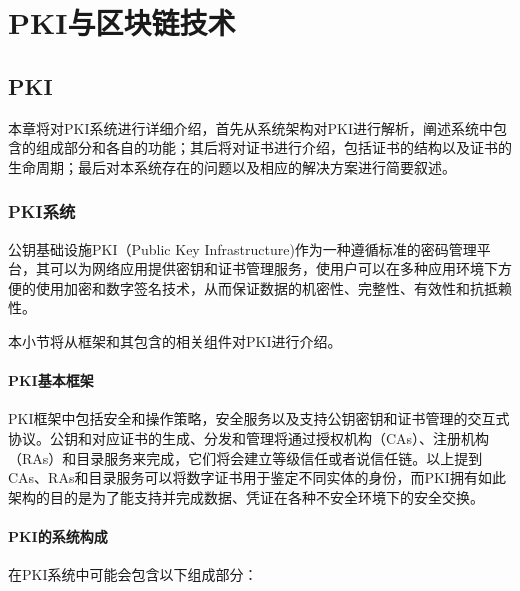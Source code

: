 
\chapter{PKI与区块链技术}



\section{PKI}

本章将对PKI系统进行详细介绍，首先从系统架构对PKI进行解析，阐述系统中包含的组成部分和各自的功能；其后将对证书进行介绍，包括证书的结构以及证书的生命周期；最后对本系统存在的问题以及相应的解决方案进行简要叙述。

\subsection{PKI系统}

公钥基础设施PKI（Public Key Infrastructure)作为一种遵循标准的密码管理平台，其可以为网络应用提供密钥和证书管理服务，使用户可以在多种应用环境下方便的使用加密和数字签名技术，从而保证数据的机密性、完整性、有效性和抗抵赖性。

本小节将从框架和其包含的相关组件对PKI进行介绍。

\subsubsection{PKI基本框架}

PKI框架中包括安全和操作策略，安全服务以及支持公钥密钥和证书管理的交互式协议。公钥和对应证书的生成、分发和管理将通过授权机构（CAs）、注册机构（RAs）和目录服务来完成\supercite{weise2001public}，它们将会建立等级信任或者说信任链。以上提到CAs、RAs和目录服务可以将数字证书用于鉴定不同实体的身份，而PKI拥有如此架构的目的是为了能支持并完成数据、凭证在各种不安全环境下的安全交换。

\subsubsection{PKI的系统构成}

在PKI系统中可能会包含以下组成部分：

